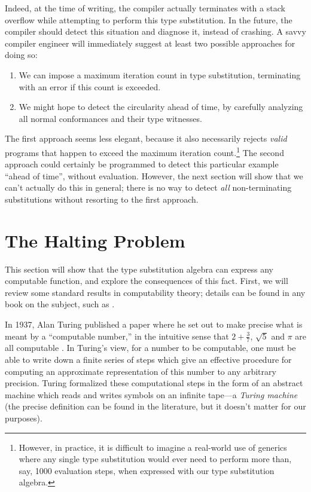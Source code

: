 \documentclass[../generics]{subfiles}
\begin{document}
Indeed, at the time of writing, the compiler actually terminates with a stack overflow while attempting to perform this type substitution. In the future, the compiler should detect this situation and diagnose it, instead of crashing. A savvy compiler engineer will immediately suggest at least two possible approaches for doing so:
\begin{enumerate}
\item We can impose a maximum iteration count in type substitution, terminating with an error if this count is exceeded.
\item We might hope to detect the circularity ahead of time, by carefully analyzing all normal conformances and their type witnesses.
\end{enumerate}
The first approach seems less elegant, because it also necessarily rejects \emph{valid} programs that happen to exceed the maximum iteration count.\footnote{However, in practice, it is difficult to imagine a real-world use of generics where any single type substitution would ever need to perform more than, say, 1000 evaluation steps, when expressed with our type substitution algebra.} The second approach could certainly be programmed to detect this particular example ``ahead of time'', without evaluation. However, the next section will show that we can't actually do this in general; there is no way to detect \emph{all} non-terminating substitutions without resorting to the first approach.

\section{The Halting Problem}\label{tag systems}

This section will show that the type substitution algebra can express any computable function, and explore the consequences of this fact. First, we will review some standard results in computability theory; details can be found in any book on the subject, such as \cite{cutland}.

In 1937, Alan Turing published a paper where he set out to make precise what is meant by a ``computable number,'' in the intuitive sense that $2+\frac{3}{7}$, $\sqrt{5}$ and $\pi$ are all computable \cite{turing}. In Turing's view, for a number to be computable, one must be able to write down a finite series of steps which give an effective procedure for computing an approximate representation of this number to any arbitrary precision. Turing formalized these computational steps in the form of an abstract machine which reads and writes symbols on an infinite tape---a \emph{Turing machine} (the precise definition can be found in the literature, but it doesn't matter for our purposes).
\end{document}
